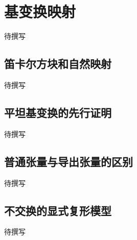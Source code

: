 
% 
% 

\section{基变换映射}
\label{g5:sec:2001}

待撰写

\subsection{笛卡尔方块和自然映射}
\label{g5:subsec:2001:01}
待撰写

\subsection{平坦基变换的先行证明}
\label{g5:subsec:2001:02}
待撰写

\subsection{普通张量与导出张量的区别}
\label{g5:subsec:2001:03}
待撰写

\subsection{不交换的显式复形模型}
\label{g5:subsec:2001:04}
待撰写
